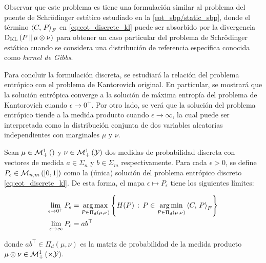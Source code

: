 Observar que este problema es tiene una formulación similar al problema del puente de Schrödinger estático estudiado en la \autoref{eot_sbp/static_sbp}, donde el término $\left\langle C,\,P\right\rangle_F$ en \eqref{eq:eot_discrete_kl} puede ser absorbido por la divergencia $\operatorname{D_{KL}}\left(P\,\|\,\mu\otimes\nu\right)$ para obtener un caso particular del problema de Schrödinger estático cuando se considera una distribución de referencia específica conocida como \textit{kernel de Gibbs}.

Para concluir la formulación discreta, se estudiará la relación del problema entrópico con el problema de Kantorovich original. En particular, se mostrará que la solución entrópica converge a la solución de máxima entropía del problema de Kantorovich cuando $\epsilon\to 0^+$. Por otro lado, se verá que la solución del problema entrópico tiende a la medida producto cuando $\epsilon\to\infty$, la cual puede ser interpretada como la distribución conjunta de dos variables aleatorias independientes con marginales $\mu$ y $\nu$.

\begin{prop}
	\label{prop:eot_convergence}
	Sean $\mu\in\mathcal{M}_+^1\left(\right)$ y $\nu\in\mathcal{M}_+^1\left(\mathcal{Y}\right)$ dos medidas de probabilidad discreta con vectores de medida $a\in\Sigma_n$ y $b\in\Sigma_m$ respectivamente. Para cada $\epsilon>0$, se define $P_\epsilon\in\mathcal{M}_{n,m}\left([0,1]\right)$ como la (única) solución del problema entrópico discreto \eqref{eq:eot_discrete_kl}. De esta forma, el mapa $\epsilon\mapsto P_\epsilon$ tiene los siguientes límites:

	\begin{align}
		\lim_{\epsilon\to 0^+} P_\epsilon    & = \operatorname*{arg\,max}_{P\in\Pi_d(\mu,\nu)} \left\{H(P)\,:\, P\in  \operatorname*{arg\,min}_{P\in\Pi_d(\mu,\nu)} \left\langle C,\,P\right\rangle_F   \right\} \\
		\lim_{\epsilon\to \infty} P_\epsilon & = ab^\top
	\end{align}

	donde $ab^\top\in\Pi_d(\mu,\nu)$ es la matriz de probabilidad de la medida producto $\mu\otimes\nu\in\probmeasure{\xspace\times\yspace}$.
\end{prop}

